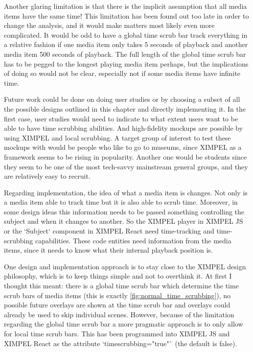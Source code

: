 Another glaring limitation is that there is the implicit assumption that all media items have the same time! This limitation has been found out too late in order to change the analysis, and it would make matters most likely even more complicated. It would be odd to have a global time scrub bar track everything in a relative fashion if one media item only takes 5 seconds of playback and another media item 500 seconds of playback. The full length of the global time scrub bar has to be pegged to the longest playing media item perhaps, but the implications of doing so would not be clear, especially not if some media items have infinite time.

Future work could be done on doing user studies or by choosing a subset of all the possible designs outlined in this chapter and directly implementing it. In the first case, user studies would need to indicate to what extent users want to be able to have time scrubbing abilities. And high-fidelity mockups are possible by using XIMPEL and local scrubbing. A target group of interest to test these mockups with would be people who like to go to museums, since XIMPEL as a framework seems to be rising in popularity. Another one would be students since they seem to be one of the most tech-savvy mainstream general groups, and they are relatively easy to recruit. 

Regarding implementation, the idea of what a media item is changes. Not only is a media item able to track time but it is also able to scrub time. Moreover, in some design ideas this information needs to be passed something controlling the subject and when it changes to another. So the XIMPEL player in XIMPEL JS or the `Subject` component in XIMPEL React need time-tracking and time-scrubbing capabilities. These code entities need information from the media items, since it needs to know what their internal playback position is.

One design and implementation approach is to stay close to the XIMPEL design philosophy, which is to keep things simple and not to overthink it. At first I thought this meant: there is a global time scrub bar which determine the time scrub bars of media items (this is exactly \ref{fig:normal_time_scrubbing}), no possible future overlays are shown at the time scrub bar and overlays could already be used to skip individual scenes. However, because of the limitation regarding the global time scrub bar a more pragmatic approach is to only allow for local time scrub bars. This has been programmed into XIMPEL JS and XIMPEL React as the attribute `timescrubbing="true"` (the default is false).

